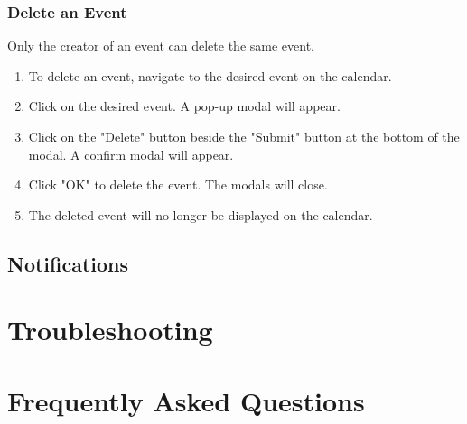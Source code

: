 \documentclass[12pt]{article}
\begin{document}
\subsubsection{Delete an Event}
Only the creator of an event can delete the same event.
\begin{enumerate}
\item To delete an event, navigate to the desired event on the calendar.
\item Click on the desired event. A pop-up modal will appear.
\item Click on the "Delete" button beside the "Submit" button at the bottom of the modal.  A confirm modal will appear.
\item Click "OK" to delete the event. The modals will close.
\item The deleted event will no longer be displayed on the calendar.
\end{enumerate}

\subsection{Notifications}



\section{Troubleshooting}

\section{Frequently Asked Questions}

\end{document}
